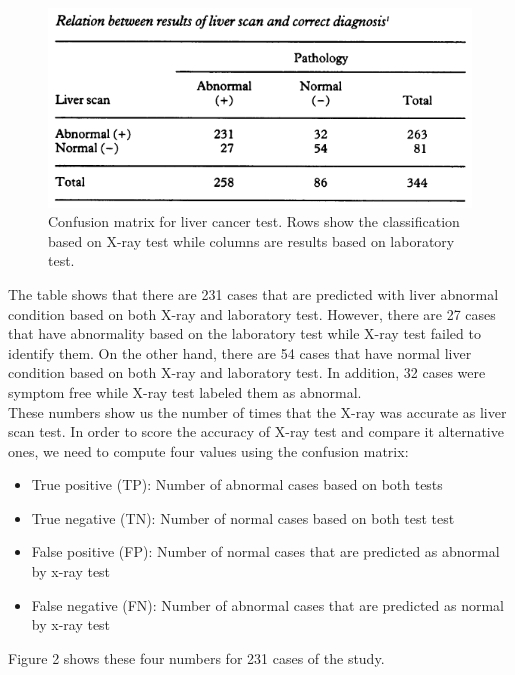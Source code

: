 \documentclass[12pt]{article}
\begin{document}
\begin{figure}
\includegraphics[width=\textwidth]{confusionMatrix.png}
\caption{Confusion matrix for liver cancer test. Rows show the classification based on X-ray test while columns are results based on laboratory test.} \label{fig1}
\end{figure}

The table shows that there are 231 cases that are predicted with liver abnormal condition based on both X-ray and laboratory test. However, there are 27 cases that have abnormality based on the laboratory test while X-ray test failed to identify them. On the other hand, there are 54 cases that have normal liver condition based on both X-ray and laboratory test. In addition, 32 cases were symptom free while X-ray test labeled them as abnormal. \\
These numbers show us the number of times that the X-ray was accurate as liver scan test. In order to score the accuracy of X-ray test and compare it alternative ones, we need to compute four values using the confusion matrix:
\newpage
\begin{center}
\begin{itemize}
\item True positive (TP): Number of abnormal cases based on both tests 
\item True negative (TN): Number of normal cases based on both test test
\item False positive (FP): Number of normal cases that are predicted as abnormal by x-ray test 
\item False negative (FN): Number of abnormal cases that are predicted as normal by x-ray test
\end{itemize}
\end{center}
Figure 2 shows these four numbers for 231 cases of the study. 
\end{document}
